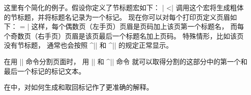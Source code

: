 {{{{{{{{{{%
这里有个简化的例子。假设你定义了节标题宏如下：
\csdisplay
\def\section#1{\medskip{\bf#1}\smallskip\mark{#1}}
|
^^|\mark|
调用这个宏将生成粗体的节标题，并将标题名记录为一个标记。
现在你可以对每个打印页定义页眉如下：
\csdisplay
\headline = {\ifodd\pageno \hfil\botmark\quad\folio
   \else \folio\quad\firstmark\hfil \fi}
|
这样，每个偶数页（左手页）页眉是页码加上该页第一个标题名，
而每个奇数页（右手页）页眉是该页最后一个标题名加上页码。
特殊情形，比如该页没有节标题，
通常也会按照 ^|\firstmark| 和 ^|\botmark| 的规定正常显示。

在用 |\vsplit| 命令\ctsref{\vsplit}分割页面时，
用 |\splitfirstmark| 和 ^|\splitbotmark| 命令\ctsref{\splitfirstmark}%
就可以取得分割的这部分中的第一个和最后一个标记的标记文本。

在中，对如何生成和取回标记作了更准确的解释。
\endconcept


}}}}}}}}}}
